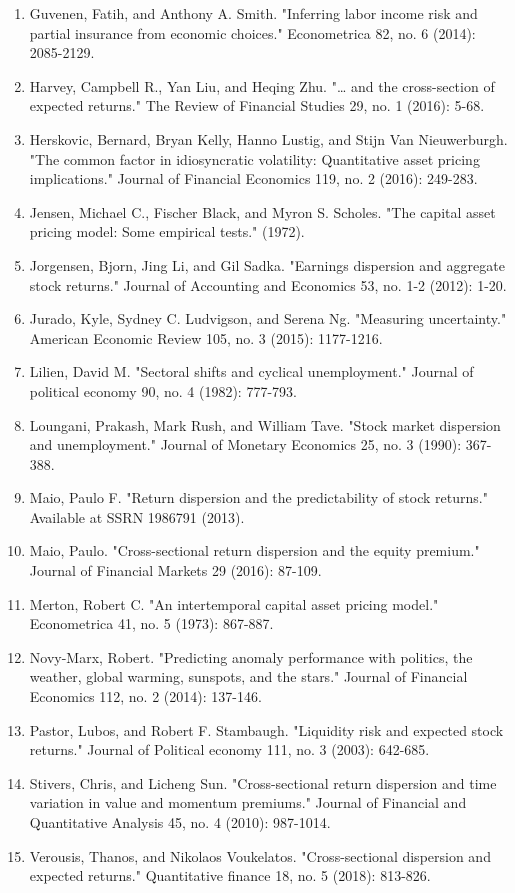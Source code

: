 \documentclass[12pt]{article}
\begin{document}
\begin{enumerate}
    \item{Guvenen, Fatih, and Anthony A. Smith. "Inferring labor income risk and partial insurance from economic choices." Econometrica 82, no. 6 (2014): 2085-2129.}
    \item {Harvey, Campbell R., Yan Liu, and Heqing Zhu. "… and the cross-section of expected returns." The Review of Financial Studies 29, no. 1 (2016): 5-68.}
    \item{Herskovic, Bernard, Bryan Kelly, Hanno Lustig, and Stijn Van Nieuwerburgh. "The common factor in idiosyncratic volatility: Quantitative asset pricing implications." Journal of Financial Economics 119, no. 2 (2016): 249-283.}
    \item {Jensen, Michael C., Fischer Black, and Myron S. Scholes. "The capital asset pricing model: Some empirical tests." (1972).}
    \item{Jorgensen, Bjorn, Jing Li, and Gil Sadka. "Earnings dispersion and aggregate stock returns." Journal of Accounting and Economics 53, no. 1-2 (2012): 1-20.}
    \item{Jurado, Kyle, Sydney C. Ludvigson, and Serena Ng. "Measuring uncertainty." American Economic Review 105, no. 3 (2015): 1177-1216.}
    \item{Lilien, David M. "Sectoral shifts and cyclical unemployment." Journal of political economy 90, no. 4 (1982): 777-793.}
    \item{Loungani, Prakash, Mark Rush, and William Tave. "Stock market dispersion and unemployment." Journal of Monetary Economics 25, no. 3 (1990): 367-388.}
    \item{Maio, Paulo F. "Return dispersion and the predictability of stock returns." Available at SSRN 1986791 (2013).}
    \item{Maio, Paulo. "Cross-sectional return dispersion and the equity premium." Journal of Financial Markets 29 (2016): 87-109.}
    \item{Merton, Robert C. "An intertemporal capital asset pricing model." Econometrica 41, no. 5 (1973): 867-887.}
    \item{Novy-Marx, Robert. "Predicting anomaly performance with politics, the weather, global warming, sunspots, and the stars." Journal of Financial Economics 112, no. 2 (2014): 137-146.}
    \item{Pastor, Lubos, and Robert F. Stambaugh. "Liquidity risk and expected stock returns." Journal of Political economy 111, no. 3 (2003): 642-685.}
    \item{Stivers, Chris, and Licheng Sun. "Cross-sectional return dispersion and time variation in value and momentum premiums." Journal of Financial and Quantitative Analysis 45, no. 4 (2010): 987-1014.}
    \item{Verousis, Thanos, and Nikolaos Voukelatos. "Cross-sectional dispersion and expected returns." Quantitative finance 18, no. 5 (2018): 813-826.}

\end{enumerate}
\end{document}
